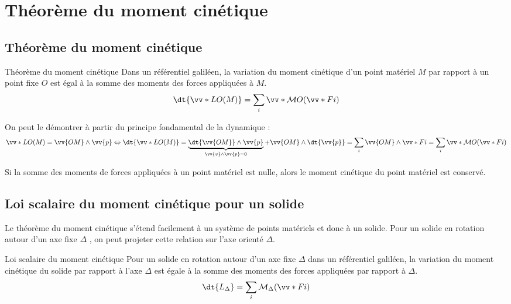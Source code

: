 \documentclass{cours}
\begin{document}
\section{Théorème du moment cinétique}%
\label{sec:theoreme_du_moment_cinetique}

\subsection{Théorème du moment cinétique}%
\label{sub:theoreme_du_moment_cinetique}
\begin{loi}{Théorème du moment cinétique}
  Dans un référentiel galiléen, la variation du moment cinétique d'un point matériel $M$ par rapport à un point fixe $O$ est égal à la somme des moments des forces appliquées à $M$. 
  \begin{equation}
    \dt{\vv*{L}{O}(M)} = \sum_i \vv*{\M}{O}(\vv*{F}{i})
  \end{equation}
\end{loi}
On peut le démontrer à partir du principe fondamental de la dynamique :
\begin{align}
  \vv*{L}{O}(M) = \vv{OM}\wedge \vv{p} \Leftrightarrow \dt{\vv*{L}{O}(M)} = \underbrace{\dt{\vv{OM}}\wedge\vv{p}}_{\vv{v}\wedge \vv{p}=0} + \vv{OM}\wedge \dt{\vv{p}} = \sum_i \vv{OM}\wedge\vv*{F}{i} = \sum_i \vv*{\M}{O}(\vv*{F}{i})
\end{align}

Si la somme des moments de forces appliquées à un point matériel est nulle, alors le moment cinétique du point matériel est conservé.

\subsection{Loi scalaire du moment cinétique pour un solide}%
\label{sub:loi_scalaire_du_moment_cinetique_pour_un_solide}

Le théorème du moment cinétique s'étend facilement à un système de points matériels et donc à un solide. Pour un solide en rotation autour d'un axe fixe $\Delta$ , on peut projeter cette relation sur l'axe orienté $\Delta$.

\begin{loi}{Loi scalaire du moment cinétique}
  Pour un solide en rotation autour d'un axe fixe $\Delta$ dans un référentiel galiléen, la variation du moment cinétique du solide par rapport à l'axe $\Delta$ est égale à la somme des moments des forces appliquées par rapport à $\Delta$. 
  \begin{equation}
    \dt{L_\Delta} = \sum_i \M_\Delta(\vv*{F}{i})
  \end{equation}
\end{loi}
\end{document}

